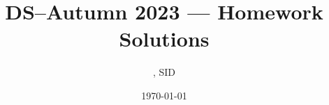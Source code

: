 \documentclass[UTF8]{ctexart}
\title{DS--Autumn 2023 --- Homework \Homework Solutions}
\author{\Name, SID \SID}
\date{\today}
\newenvironment{qparts}{\begin{enumerate}[{(}a{)}]}{\end{enumerate}} %
\newenvironment{Solutions}{\par{\bf Solutions}:}%
\begin{document}
\maketitle


\begin{abstract}
    二叉树实现及应用 面向过程 面向对象

    定义
    
    二叉树遍历（ 九种方法 递归 非递归 * 2 * 3 

    preorder inorder postorder 

    复杂度 时间空间

    最坏情况 最好情况 最废空间 最省空间

    二叉树的主要性质

    语法制导编辑器

    修改数据结构 （不借助外力 stack queue 

    三叉链表 利用空指针（增加标识

    哈夫曼树 定义性质应用

    二叉树分类

    BST

    ASL 平均查找长度
    
\end{abstract}













\section*{1. 二叉树实现}
\begin{qparts}
    \item 
    功能实现
    
    \item
    应用 
\end{qparts}

\subsection*{1.1 面向过程}

\begin{Solutions}
\begin{enumerate} %

\item 结构体
ArrayDeque.java
\begin{lstlisting}
/** Array based list.
*  @author zilong
*/


\end{lstlisting}


\end{enumerate}

\end{Solutions}
\end{document}
